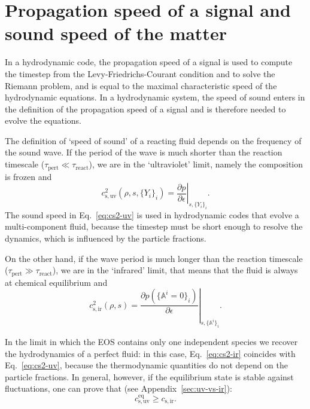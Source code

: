 \documentclass[aps,prd,twocolumn,a4paper,floatfix,nofootbib,superscriptaddress,nofootinbib]{revtex4}
\newcommand{\req}{\mathrm{eq}}
\begin{document}
\section{Propagation speed of a signal and sound speed of the matter}
\label{sec:cs}

In a hydrodynamic code, the propagation speed of a signal is used to compute
the timestep from the Levy-Friedrichs-Courant condition and to solve the
Riemann problem, and is equal to the maximal characteristic speed of the
hydrodynamic equations.  In a hydrodynamic system, the speed of
sound enters in the definition of the propagation speed of a signal and is
therefore needed to evolve the equations.

The definition of `speed of sound' of a reacting fluid depends on the frequency
of the sound wave.
%
If the period of the wave is much shorter than the reaction timescale ($\tau_\mathrm{pert}\ll\tau_\mathrm{react}$),
we are in the `ultraviolet' limit, namely the composition is frozen and
%
\begin{equation}
\label{eq:cs2-uv}
c_\mathrm{s,uv}^2(\rho,s,\{Y_i\}_i)=\left.\frac{\partial p}{\partial \epsilon}\right|_{s,\{Y_i\}_i}.
\end{equation}
%
The sound speed in Eq.~\eqref{eq:cs2-uv} is used in hydrodynamic codes that
evolve a multi-component fluid, because the timestep must be short enough to
resolve the dynamics, which is influenced by the particle fractions.

On the other hand, if the wave period is much longer than the reaction timescale
($\tau_\mathrm{pert}\gg\tau_\mathrm{react}$), we are in the `infrared'
limit, that means that the fluid is always at chemical equilibrium and 
%
\begin{equation}
\label{eq:cs2-ir}
c_\mathrm{s,ir}^2(\rho,s)=\left.\frac{\partial p(\{\mathbb{A}^i=0\}_i)}{\partial \epsilon}\right|_{s,\{\mathbb{A}^i\}_i}.
\end{equation}

In the limit in which the EOS contains only one independent species we recover
the hydrodynamics of a perfect fluid: in this case, Eq.~\eqref{eq:cs2-ir}
coincides with Eq.~\eqref{eq:cs2-uv}, because the thermodynamic quantities do
not depend on the particle fractions.
%
In general, however, if the equilibrium state is stable against fluctuations,
one can prove that (see Appendix~\ref{sec:uv-vs-ir}):
\begin{equation}
\label{eq:csuv-geq-csir}
c_\mathrm{s,uv}^{\req } \geq c_\mathrm{s,ir}.
\end{equation}
\end{document}
